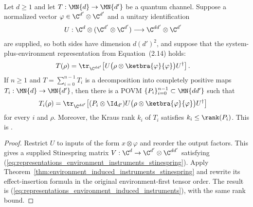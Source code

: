 \begin{proposition}
    \label{prop:environment_induced_instruments}
    \leanok
    Let $d\geq1$ and let $T:\MN{d}\to\MN{d'}$ be a quantum channel.
    Suppose a normalized vector $\varphi\in\C^{d'}\otimes\C^{d'}$ and a
    unitary identification
    \begin{align}
        U:\C^d\otimes(\C^{d'}\otimes\C^{d'})
        &\longrightarrow \C^{dd'}\otimes\C^{d'}
        \notag
    \end{align}
    are supplied, so both sides have dimension $d(d')^2$, and suppose that
    the system-plus-environment representation from Equation~(2.14) holds:
    \begin{align}
        T(\rho)
        &=\tr_{\C^{dd'}}\!\left[
          U\bigl(\rho\otimes\ketbra{\varphi}{\varphi}\bigr)U^\dagger
          \right].
        \label{eq:representations_environment_instruments_open_system}
    \end{align}
    If $n\geq1$ and $T=\sum_{i=0}^{n-1}T_i$ is a decomposition into
    completely positive maps $T_i:\MN{d}\to\MN{d'}$, then there is a POVM
    $\{P_i\}_{i=0}^{n-1}\subset\MN{dd'}$ such that
    \begin{align}
        T_i(\rho)
        &=\tr_{\C^{dd'}}\!\left[
          (P_i\otimes\Id_{d'})
          U\bigl(\rho\otimes\ketbra{\varphi}{\varphi}\bigr)U^\dagger
          \right]
        \label{eq:representations_environment_induced_instruments}
    \end{align}
    for every $i$ and $\rho$. Moreover, the Kraus rank $k_i$ of $T_i$
    satisfies $k_i\leq\rank(P_i)$. This is
    \cite[Proposition~(Environment induced instruments), Equation~(2.15)]
    {Wolf2012Quantum}.
\end{proposition}

\begin{proof}\leanok
    Restrict $U$ to inputs of the form $x\otimes\varphi$ and reorder the
    output factors. This gives a supplied Stinespring matrix
    $V:\C^d\to\C^{d'}\otimes\C^{dd'}$ satisfying
    (\ref{eq:representations_environment_instruments_stinespring}). Apply
    Theorem~\ref{thm:environment_induced_instruments_stinespring} and rewrite
    its effect-insertion formula in the original environment-first tensor
    order. The result is
    (\ref{eq:representations_environment_induced_instruments}), with the same
    rank bound.
\end{proof}


